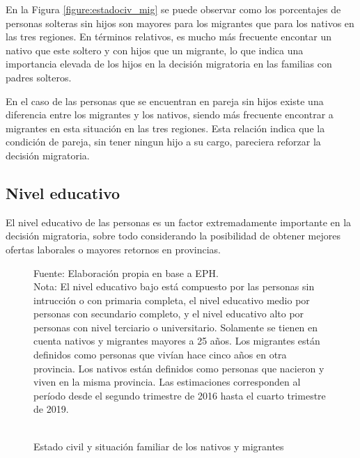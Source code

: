 \documentclass[12pt,a4paper]{article}
\begin{document}
En la Figura \ref{figure:estadociv_mig} se puede observar como los porcentajes de personas solteras sin hijos son mayores para los migrantes que para los nativos en las tres regiones. En términos relativos, es mucho más frecuente encontar un nativo que este soltero y con hijos que un migrante, lo que indica una importancia elevada de los hijos en la decisión migratoria en las familias con padres solteros.

En el caso de las personas que se encuentran en pareja sin hijos existe una diferencia entre los migrantes y los nativos, siendo más frecuente encontrar a migrantes en esta situación en las tres regiones. Esta relación indica que la condición de pareja, sin tener ningun hijo a su cargo, pareciera reforzar la decisión migratoria.

\subsection{Nivel educativo}

El nivel educativo de las personas es un factor extremadamente importante en la decisión migratoria, sobre todo considerando la posibilidad de obtener mejores ofertas laborales o mayores retornos  en provincias.

\begin{figure}[htbp!]
\begin{center}
\caption{\\Estado civil y situación familiar de los nativos y migrantes}
\label{figure:niveled_mig}
 
\end{center}
\begin{flushleft}
\begin{scriptsize}
Fuente: Elaboración propia en base a EPH.\\
Nota: El nivel educativo bajo está compuesto por las personas sin intrucción o con primaria completa, el nivel educativo medio por personas con secundario completo, y el nivel educativo alto por personas con nivel terciario o universitario. Solamente se tienen en cuenta nativos y migrantes mayores a 25 años. Los migrantes están definidos como personas que vivían hace cinco años en otra provincia. Los nativos están definidos como personas que nacieron y viven en la misma provincia. Las estimaciones corresponden al período desde el segundo trimestre de 2016 hasta el cuarto trimestre de 2019.
\end{scriptsize}
\end{flushleft}
\end{figure}
\end{document}

